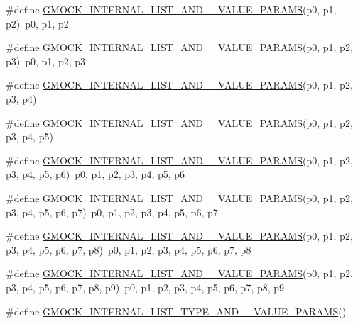 \begin{DoxyCompactItemize}
\item 
\#define \mbox{\hyperlink{gmock-generated-actions_8h_a10f92233f148b19f341e1a17267107d3}{G\+M\+O\+C\+K\+\_\+\+I\+N\+T\+E\+R\+N\+A\+L\+\_\+\+L\+I\+S\+T\+\_\+\+A\+N\+D\+\_\+\_\+\+V\+A\+L\+U\+E\+\_\+\+P\+A\+R\+A\+MS}}(p0,  p1,  p2)~p0, p1, p2
\item 
\#define \mbox{\hyperlink{gmock-generated-actions_8h_a8df889711a5f99ed76736a2bc5030cf2}{G\+M\+O\+C\+K\+\_\+\+I\+N\+T\+E\+R\+N\+A\+L\+\_\+\+L\+I\+S\+T\+\_\+\+A\+N\+D\+\_\+\_\+\+V\+A\+L\+U\+E\+\_\+\+P\+A\+R\+A\+MS}}(p0,  p1,  p2,  p3)~p0, p1, p2, p3
\item 
\#define \mbox{\hyperlink{gmock-generated-actions_8h_a4bfd52ebc75b6da1a84e5a59e12995fe}{G\+M\+O\+C\+K\+\_\+\+I\+N\+T\+E\+R\+N\+A\+L\+\_\+\+L\+I\+S\+T\+\_\+\+A\+N\+D\+\_\+\_\+\+V\+A\+L\+U\+E\+\_\+\+P\+A\+R\+A\+MS}}(p0,  p1,  p2,  p3,  p4)
\item 
\#define \mbox{\hyperlink{gmock-generated-actions_8h_a553114b6d5e3f751a9f122fb71a3abdb}{G\+M\+O\+C\+K\+\_\+\+I\+N\+T\+E\+R\+N\+A\+L\+\_\+\+L\+I\+S\+T\+\_\+\+A\+N\+D\+\_\+\_\+\+V\+A\+L\+U\+E\+\_\+\+P\+A\+R\+A\+MS}}(p0,  p1,  p2,  p3,  p4,  p5)
\item 
\#define \mbox{\hyperlink{gmock-generated-actions_8h_a6a66c76963794fca308b7e2852188e06}{G\+M\+O\+C\+K\+\_\+\+I\+N\+T\+E\+R\+N\+A\+L\+\_\+\+L\+I\+S\+T\+\_\+\+A\+N\+D\+\_\+\_\+\+V\+A\+L\+U\+E\+\_\+\+P\+A\+R\+A\+MS}}(p0,  p1,  p2,  p3,  p4,  p5,  p6)~p0, p1, p2, p3, p4, p5, p6
\item 
\#define \mbox{\hyperlink{gmock-generated-actions_8h_af9a5e8a55b02e7afac317a2613bd29ec}{G\+M\+O\+C\+K\+\_\+\+I\+N\+T\+E\+R\+N\+A\+L\+\_\+\+L\+I\+S\+T\+\_\+\+A\+N\+D\+\_\+\_\+\+V\+A\+L\+U\+E\+\_\+\+P\+A\+R\+A\+MS}}(p0,  p1,  p2,  p3,  p4,  p5,  p6,  p7)~p0, p1, p2, p3, p4, p5, p6, p7
\item 
\#define \mbox{\hyperlink{gmock-generated-actions_8h_a3e91ec053856b1b3c011b71810fb0992}{G\+M\+O\+C\+K\+\_\+\+I\+N\+T\+E\+R\+N\+A\+L\+\_\+\+L\+I\+S\+T\+\_\+\+A\+N\+D\+\_\+\_\+\+V\+A\+L\+U\+E\+\_\+\+P\+A\+R\+A\+MS}}(p0,  p1,  p2,  p3,  p4,  p5,  p6,  p7,  p8)~p0, p1, p2, p3, p4, p5, p6, p7, p8
\item 
\#define \mbox{\hyperlink{gmock-generated-actions_8h_a4dbbb45245e68e2f0eaf65d273c8822c}{G\+M\+O\+C\+K\+\_\+\+I\+N\+T\+E\+R\+N\+A\+L\+\_\+\+L\+I\+S\+T\+\_\+\+A\+N\+D\+\_\+\_\+\+V\+A\+L\+U\+E\+\_\+\+P\+A\+R\+A\+MS}}(p0,  p1,  p2,  p3,  p4,  p5,  p6,  p7,  p8,  p9)~p0, p1, p2, p3, p4, p5, p6, p7, p8, p9
\item 
\#define \mbox{\hyperlink{gmock-generated-actions_8h_a76ec2981c2b6c52e3c6cdd1eba7f37ac}{G\+M\+O\+C\+K\+\_\+\+I\+N\+T\+E\+R\+N\+A\+L\+\_\+\+L\+I\+S\+T\+\_\+\+T\+Y\+P\+E\+\_\+\+A\+N\+D\+\_\+\_\+\+V\+A\+L\+U\+E\+\_\+\+P\+A\+R\+A\+MS}}()

\end{DoxyCompactItemize}
